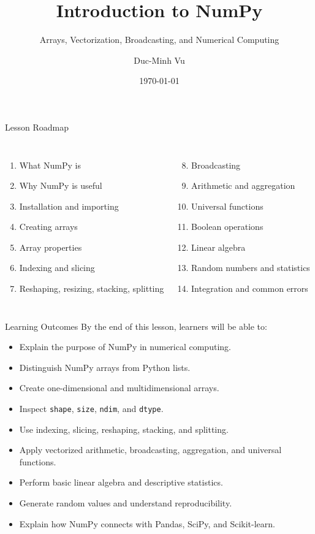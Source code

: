 \documentclass[aspectratio=169,11pt]{beamer}
\title[Introduction to NumPy]{Introduction to NumPy}
\subtitle{Arrays, Vectorization, Broadcasting, and Numerical Computing}
\author{Duc-Minh Vu}
\institute{SLSCM Lab -- FDA -- NEU}
\date{\today}
\begin{document}
\begin{frame}
  \titlepage
\end{frame}

\begin{frame}{Lesson Roadmap}
\begin{columns}[T]
\begin{enumerate}
  \item What NumPy is
  \item Why NumPy is useful
  \item Installation and importing
  \item Creating arrays
  \item Array properties
  \item Indexing and slicing
  \item Reshaping, resizing, stacking, splitting
\end{enumerate}
\begin{enumerate}
  \setcounter{enumi}{7}
  \item Broadcasting
  \item Arithmetic and aggregation
  \item Universal functions
  \item Boolean operations
  \item Linear algebra
  \item Random numbers and statistics
  \item Integration and common errors
\end{enumerate}
\end{columns}
\end{frame}

\begin{frame}{Learning Outcomes}
\small
By the end of this lesson, learners will be able to:
\begin{itemize}
  \item Explain the purpose of NumPy in numerical computing.
  \item Distinguish NumPy arrays from Python lists.
  \item Create one-dimensional and multidimensional arrays.
  \item Inspect \texttt{shape}, \texttt{size}, \texttt{ndim}, and \texttt{dtype}.
  \item Use indexing, slicing, reshaping, stacking, and splitting.
  \item Apply vectorized arithmetic, broadcasting, aggregation, and universal functions.
  \item Perform basic linear algebra and descriptive statistics.
  \item Generate random values and understand reproducibility.
  \item Explain how NumPy connects with Pandas, SciPy, and Scikit-learn.
\end{itemize}
\end{frame}
\end{document}
